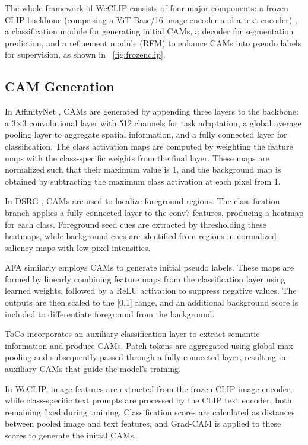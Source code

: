 The whole framework of WeCLIP\cite{wsss_frozen_clip} consists of four major components: a frozen CLIP backbone (comprising a ViT-Base/16 image encoder and a text encoder) \cite{transformer_vit}, a classification module for generating initial CAMs, a decoder for segmentation prediction, and a refinement module (RFM) to enhance CAMs into pseudo labels for supervision, as shown in ~\autoref{fig:frozenclip}.

\subsection{CAM Generation}
\label{subsec:cam-generation}
In AffinityNet \cite{wsss_affinitynet}, CAMs are generated by appending three layers to the backbone: a 3×3 convolutional layer with 512 channels for task adaptation, a global average pooling layer to aggregate spatial information, and a fully connected layer for classification. The class activation maps are computed by weighting the feature maps with the class-specific weights from the final layer. These maps are normalized such that their maximum value is 1, and the background map is obtained by subtracting the maximum class activation at each pixel from 1.

In DSRG \cite{wsss_dsrg_deep_seeded_region_growing}, CAMs \cite{cam} are used to localize foreground regions. The classification branch applies a fully connected layer to the conv7 features, producing a heatmap for each class. Foreground seed cues are extracted by thresholding these heatmaps, while background cues are identified from regions in normalized saliency maps with low pixel intensities.

AFA \cite{wsss_afa_affinity_from_attention} similarly employs CAMs to generate initial pseudo labels. These maps are formed by linearly combining feature maps from the classification layer using learned weights, followed by a ReLU activation to suppress negative values. The outputs are then scaled to the [0,1] range, and an additional background score is included to differentiate foreground from the background.

ToCo \cite{wsss_toco_token_contrast} incorporates an auxiliary classification layer to extract semantic information and produce CAMs. Patch tokens are aggregated using global max pooling and subsequently passed through a fully connected layer, resulting in auxiliary CAMs that guide the model's training.

In WeCLIP\cite{wsss_frozen_clip}, image features are extracted from the frozen CLIP image encoder, while class-specific text prompts are processed by the CLIP text encoder, both remaining fixed during training. Classification scores are calculated as distances between pooled image and text features, and Grad-CAM \cite{cam_grad} is applied to these scores to generate the initial CAMs.



